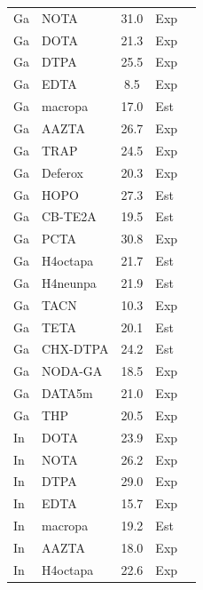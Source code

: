 \documentclass[journal=jacsat,manuscript=suppinfo]{achemso}
\begin{document}
\begin{longtable}{@{}llcp{1.5cm}c@{}}
  Ga & NOTA     & 31.0  & Exp & \cite{Notni2010} \\
  Ga & DOTA     & 21.3  & Exp & \cite{Notni2010} \\
  Ga & DTPA     & 25.5  & Exp & \cite{MartellSmith2004} \\
  Ga & EDTA     & 8.5   & Exp & \cite{MartellSmith2004} \\
  Ga & macropa  & 17.0  & Est & \cite{MartellSmith2004,Hancock1989} \\
  Ga & AAZTA    & 26.7  & Exp & \cite{Notni2010} \\
  Ga & TRAP     & 24.5  & Exp & \cite{Simecek2012} \\
  Ga & Deferox  & 20.3  & Exp & \cite{MartellSmith2004} \\
  Ga & HOPO     & 27.3  & Est & \cite{MartellSmith2004,Hancock1989} \\
  Ga & CB-TE2A  & 19.5  & Est & \cite{MartellSmith2004,Hancock1989} \\
  Ga & PCTA     & 30.8  & Exp & \cite{Notni2010} \\
  Ga & H4octapa & 21.7  & Est & \cite{MartellSmith2004,Hancock1989} \\
  Ga & H4neunpa & 21.9  & Est & \cite{MartellSmith2004,Hancock1989} \\
  Ga & TACN     & 10.3  & Exp & \cite{MartellSmith2004} \\
  Ga & TETA     & 20.1  & Est & \cite{MartellSmith2004,Hancock1989} \\
  Ga & CHX-DTPA & 24.2  & Est & \cite{MartellSmith2004,Hancock1989} \\
  Ga & NODA-GA  & 18.5  & Exp & \cite{Notni2010} \\
  Ga & DATA5m   & 21.0  & Exp & \cite{Simecek2012} \\
  Ga & THP      & 20.5  & Exp & \cite{Notni2010} \\
  In & DOTA     & 23.9  & Exp & \cite{MartellSmith2004} \\
  In & NOTA     & 26.2  & Exp & \cite{MartellSmith2004} \\
  In & DTPA     & 29.0  & Exp & \cite{MartellSmith2004} \\
  In & EDTA     & 15.7  & Exp & \cite{MartellSmith2004} \\
  In & macropa  & 19.2  & Est & \cite{MartellSmith2004,Hancock1989} \\
  In & AAZTA    & 18.0  & Exp & \cite{MartellSmith2004} \\
  In & H4octapa & 22.6  & Exp & \cite{Morgan2023} \\

\end{longtable}
\end{document}
